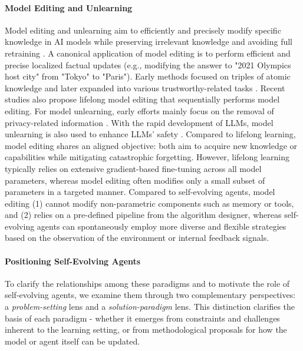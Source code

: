 \paragraph{Model Editing and Unlearning}
Model editing and unlearning aim to efficiently and precisely modify specific knowledge in AI models while preserving irrelevant knowledge and avoiding full retraining \citep{wang2024knowledge, wang2025comprehensive, zhang2024comprehensive, wang2025comprehensive, nguyen2022survey, geng2025comprehensive}. A canonical application of model editing is to perform efficient and precise localized factual updates (e.g., modifying the answer to "2021 Olympics host city" from "Tokyo" to "Paris"). Early methods focused on triples of atomic knowledge and later expanded into various trustworthy-related tasks \citep{fang2025alphaedit, huang2025model}. Recent studies also propose lifelong model editing\citep{chen2024lifelong} that sequentially performs model editing.
For model unlearning, early efforts mainly focus on the removal of privacy-related information \citep{chen2021machine}. With the rapid development of LLMs, model unlearning is also used to enhance LLMs' safety \citep{safe_unlearning, li2024wmdp, circuit_breaker, lu2025x}. 
Compared to lifelong learning, model editing shares an aligned objective: both aim to acquire new knowledge or capabilities while mitigating catastrophic forgetting. However, lifelong learning typically relies on extensive gradient-based fine-tuning across all model parameters, whereas model editing often modifies only a small subset of parameters in a targeted manner.
Compared to self-evolving agents, model editing (1) cannot modify non-parametric components such as memory or tools, and (2) relies on a pre-defined pipeline from the algorithm designer, whereas self-evolving agents can spontaneously employ more diverse and flexible strategies based on the observation of the environment or internal feedback signals.




\paragraph{Positioning Self-Evolving Agents}

To clarify the relationships among these paradigms and to motivate the role of self-evolving agents, we examine them through two complementary perspectives: a \emph{problem-setting} lens and a \emph{solution-paradigm} lens. This distinction clarifies the basis of each paradigm - whether it emerges from constraints and challenges inherent to the learning setting, or from methodological proposals for how the model or agent itself can be updated.

